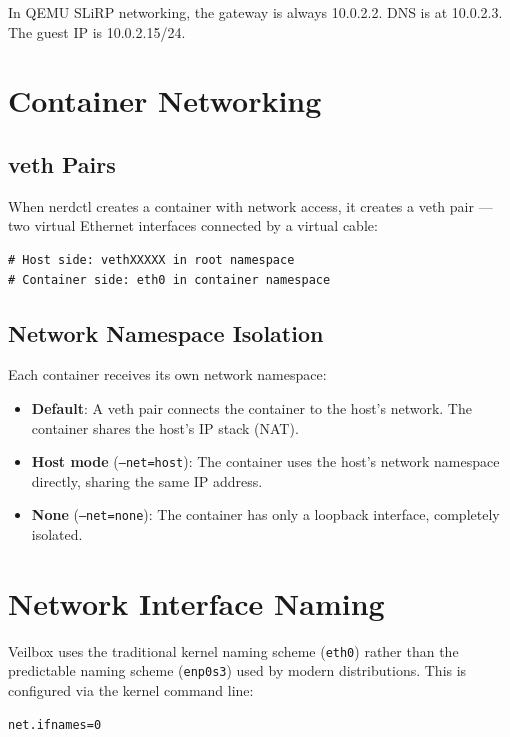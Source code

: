In QEMU SLiRP networking, the gateway is always 10.0.2.2. DNS is
at 10.0.2.3. The guest IP is 10.0.2.15/24.

\section{Container Networking}

\subsection{veth Pairs}

When nerdctl creates a container with network access, it creates a veth
pair — two virtual Ethernet interfaces connected by a virtual cable:

\begin{lstlisting}
# Host side: vethXXXXX in root namespace
# Container side: eth0 in container namespace
\end{lstlisting}

\subsection{Network Namespace Isolation}

Each container receives its own network namespace:

\begin{itemize}[nosep]
  \item \textbf{Default}: A veth pair connects the container to the host's
        network. The container shares the host's IP stack (NAT).
  \item \textbf{Host mode} (\texttt{--net=host}): The container uses the
        host's network namespace directly, sharing the same IP address.
  \item \textbf{None} (\texttt{--net=none}): The container has only a
        loopback interface, completely isolated.
\end{itemize}


\section{Network Interface Naming}

Veilbox uses the traditional kernel naming scheme (\texttt{eth0}) rather
than the predictable naming scheme (\texttt{enp0s3}) used by modern
distributions. This is configured via the kernel command line:

\begin{lstlisting}
net.ifnames=0
\end{lstlisting}

